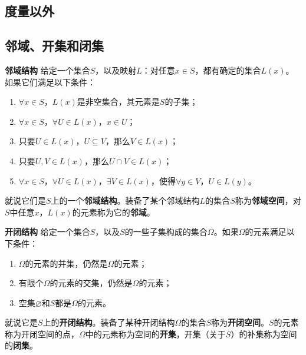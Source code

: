 \documentclass[12pt,UTF8]{ctexbook}
\begin{document}
\begin{appendix}

\chapter{度量以外}

\section{邻域、开集和闭集}

\begin{df}{\textbf{邻域结构}}\label{df:a-0-0}
    给定一个集合$S$，以及映射$L$：对任意$x\in S$，都有确定的集合$L(x)$。如果它们满足以下条件：
    \begin{enumerate}
        \item $\forall x\in S$，$L(x)$是非空集合，其元素是$S$的子集；
        \item $\forall x\in S$，$\forall U \in L(x)$，$x\in U$；
        \item 只要$U\in L(x)$，$U\subseteq V$，那么$V\in L(x)$；
        \item 只要$U, V\in L(x)$，那么$U\cap V \in L(x)$；
        \item $\forall x\in S$，$\forall U\in L(x)$，$\exists V \in L(x)$，使得$\forall y\in V$，$U\in L(y)$。
    \end{enumerate}
    就说它们是$S$上的一个\textbf{邻域结构}。装备了某个邻域结构$L$的集合$S$称为\textbf{邻域空间}，对$S$中任意$x$，$L(x)$的元素称为它的\textbf{邻域}。
\end{df}

\begin{df}{\textbf{开闭结构}}\label{df:a-0-1}
    给定一个集合$S$，以及$S$的一些子集构成的集合$\Omega$。如果$\Omega$的元素满足以下条件：
    \begin{enumerate}
        \item $\Omega$的元素的并集，仍然是$\Omega$的元素；
        \item 有限个$\Omega$的元素的交集，仍然是$\Omega$的元素；
        \item 空集$\varnothing$和$S$都是$\Omega$的元素。
    \end{enumerate}
    就说它是$S$上的\textbf{开闭结构}。装备了某种开闭结构$\Omega$的集合$S$称为\textbf{开闭空间}。$S$的元素称为开闭空间的点，$\Omega$中的元素称为空间的\textbf{开集}，开集（关于$S$）的补集称为空间的\textbf{闭集}。
\end{df}


\end{appendix}
\end{document}

